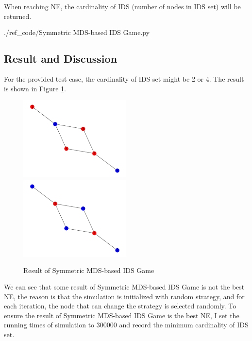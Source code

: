 \documentclass[a4paper, oneside, final, 12pt]{scrartcl} %
\begin{document}
When reaching NE, the cardinality of IDS (number of nodes in IDS set) will be returned.


  {./ref_code/Symmetric MDS-based IDS Game.py}

\subsection{Result and Discussion}

For the provided test case, the cardinality of IDS set might be 2 or 4.
The result is shown in Figure \ref{fig:Result of Symmetric MDS-based IDS Game}.

\begin{figure}[h]
  \includegraphics[width=0.5\textwidth]{./image/result_ids_2.png}
  \includegraphics[width=0.5\textwidth]{./image/result_ids.png}
  \caption{Result of Symmetric MDS-based IDS Game}
  \label{fig:Result of Symmetric MDS-based IDS Game}
\end{figure}

We can see that some result of Symmetric MDS-based IDS Game is not the best NE,
the reason is that the simulation is initialized with random strategy,
and for each iteration, the node that can change the strategy is selected randomly.
To ensure the result of Symmetric MDS-based IDS Game is the best NE,
I set the running times of simulation to 300000 and record the minimum cardinality of IDS set.
\end{document}
